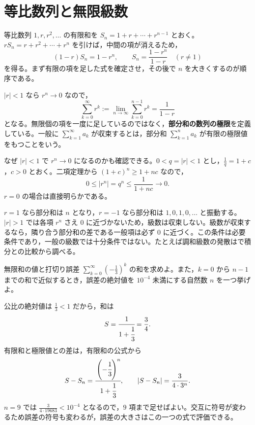 \section{等比数列と無限級数}\label{節:等比級数}
等比数列 $1,r,r^2,\ldots$ の有限和を $S_n=1+r+\cdots+r^{n-1}$ とおく。$rS_n=r+r^2+\cdots+r^n$ を引けば，中間の項が消えるため，
\[
 (1-r)S_n=1-r^n,
 \qquad
 S_n=\frac{1-r^n}{1-r}\quad(r\ne1)
\]
を得る。まず有限の項を足した式を確定させ，その後で $n$ を大きくするのが順序である。

$|r|<1$ なら $r^n\to0$ なので，
\[
 \sum_{k=0}^{\infty}r^k
 :=\lim_{n\to\infty}\sum_{k=0}^{n-1}r^k
 =\frac1{1-r}
\]
となる。無限個の項を一度に足しているのではなく，\textbf{部分和の数列の極限}を定義している。一般に $\sum_{k=1}^{\infty}a_k$ が収束するとは，部分和 $\sum_{k=1}^{n}a_k$ が有限の極限値をもつことをいう。

なぜ $|r|<1$ で $r^n\to0$ になるのかも確認できる。$0<q=|r|<1$ とし，$\frac1q=1+c$，$c>0$ とおく。二項定理から $(1+c)^n\ge1+nc$ なので，
\[
 0\le |r^n|=q^n\le\frac1{1+nc}\longrightarrow0.
\]
$r=0$ の場合は直接明らかである。

$r=1$ なら部分和は $n$ となり，$r=-1$ なら部分和は $1,0,1,0,\ldots$ と振動する。$|r|>1$ では各項 $r^n$ さえ $0$ に近づかないため，級数は収束しない。級数が収束するなら，隣り合う部分和の差である一般項は必ず $0$ に近づく。この条件は必要条件であり，一般の級数では十分条件ではない。たとえば調和級数の発散はで積分との比較から調べる。

\begin{example}{無限和の値と打切り誤差}
$\sum_{k=0}^{\infty}\left(-\frac13\right)^k$ の和を求めよ。また，$k=0$ から $n-1$ までの和で近似するとき，誤差の絶対値を $10^{-4}$ 未満にする自然数 $n$ を一つ挙げよ。
\end{example}
公比の絶対値は $\frac13<1$ だから，和は
\[
 S=\cfrac{1}{1+\cfrac13}=\frac34.
\]
有限和と極限値との差は，有限和の公式から
\[
 S-S_n=\cfrac{\left(-\cfrac13\right)^n}{1+\cfrac13},
 \qquad
 |S-S_n|=\frac{3}{4\cdot3^n}.
\]
$n=9$ では $\frac3{4\cdot19683}<10^{-4}$ となるので，$9$ 項まで足せばよい。交互に符号が変わるため誤差の符号も変わるが，誤差の大きさはこの一つの式で評価できる。

